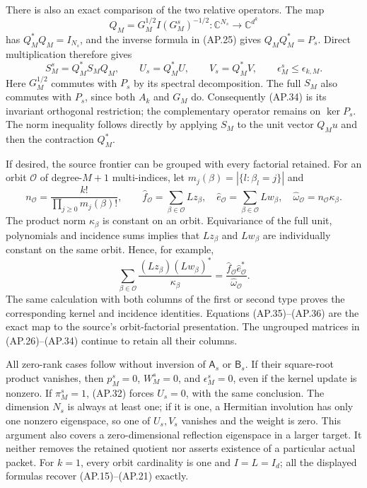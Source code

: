 There is also an exact comparison of the two relative operators.
The map
\[
 Q_M=G_M^{1/2}I(G_M^s)^{-1/2}:
            \mathbb C^{N_s}\longrightarrow\mathbb C^{d^k}
\]
has \(Q_M^*Q_M=I_{N_s}\), and the inverse formula in
(AP.25) gives \(Q_MQ_M^*=P_s\).  Direct multiplication
therefore gives
\[
 S_M^s=Q_M^*S_MQ_M,\qquad
 U_s=Q_M^*U,\qquad V_s=Q_M^*V,\qquad
 \epsilon_M^s\le\epsilon_{k,M}.                       \tag{AP.34}
\]
Here \(G_M^{1/2}\) commutes with \(P_s\) by its
spectral decomposition.  The full \(S_M\) also commutes
with \(P_s\), since both \(A_k\) and \(G_M\) do.
Consequently (AP.34) is its invariant orthogonal restriction;
the complementary operator remains on \(\ker P_s\).
The norm inequality follows directly by applying \(S_M\)
to the unit vector \(Q_Mu\) and then the contraction
\(Q_M^*\).

If desired, the source frontier can be grouped with every factorial
retained.  For an orbit \(\mathcal O\) of degree-\(M+1\)
multi-indices, let
\(m_j(\beta)=|\{l:\beta_l=j\}|\) and
\[
 n_{\mathcal O}=\frac{k!}{\prod_{j\ge0}m_j(\beta)!},\qquad
 \widehat f_{\mathcal O}=\sum_{\beta\in\mathcal O}Lz_\beta,
 \quad\widehat e_{\mathcal O}=\sum_{\beta\in\mathcal O}Lw_\beta,
 \quad\widehat\omega_{\mathcal O}=n_{\mathcal O}\kappa_\beta.
                                                               \tag{AP.35}
\]
The product norm \(\kappa_\beta\) is constant on an orbit.
Equivariance of the full unit, polynomials and incidence sums implies
that \(Lz_\beta\) and \(Lw_\beta\) are individually
constant on the same orbit.  Hence, for example,
\[
 \sum_{\beta\in\mathcal O}
       \frac{(Lz_\beta)(Lw_\beta)^*}{\kappa_\beta}
       =\frac{\widehat f_{\mathcal O}
                    \widehat e_{\mathcal O}^*}
                    {\widehat\omega_{\mathcal O}}.     \tag{AP.36}
\]
The same calculation with both columns of the first or second type
proves the corresponding kernel and incidence identities.
Equations (AP.35)--(AP.36) are the exact map to the source's
orbit-factorial presentation.  The ungrouped matrices in
(AP.26)--(AP.34) continue to retain all their columns.

All zero-rank cases follow without inversion of \(\mathsf A_s\)
or \(\mathsf B_s\).  If their square-root product vanishes,
then \(p_M^s=0\), \(W_M^s=0\), and
\(\epsilon_M^s=0\), even if the kernel update is nonzero.
If \(\pi_M^s=1\), (AP.32) forces \(U_s=0\), with
the same conclusion.  The dimension \(N_s\) is always at
least one; if it is one, a Hermitian involution has only one
nonzero eigenspace, so one of \(U_s,V_s\) vanishes and
the weight is zero.  This argument also covers a zero-dimensional
reflection eigenspace in a larger target.  It neither removes the
retained quotient nor asserts existence of a particular actual packet.
For \(k=1\), every orbit cardinality is one and \(I=L=I_d\);
all the displayed formulas recover (AP.15)--(AP.21) exactly.

